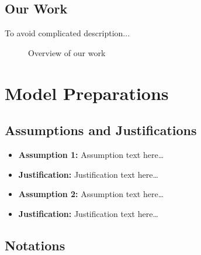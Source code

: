 \documentclass{mcmthesis}
\begin{document}
\subsection{Our Work}

To avoid complicated description...
\begin{figure}[H]
    \centering
    \caption{Overview of our work}
    \label{fig:workchart}
\end{figure}

\section{Model Preparations}

\subsection{Assumptions and Justifications}
\begin{itemize}
    \item \textbf{Assumption 1:} Assumption text here\ldots
    \item \textbf{Justification:} Justification text here\ldots

    \item \textbf{Assumption 2:} Assumption text here\ldots
    \item \textbf{Justification:} Justification text here\ldots
\end{itemize}

\subsection{Notations}
\renewcommand{\arraystretch}{1.25}
\setlength{\tabcolsep}{10pt}
\end{document}

